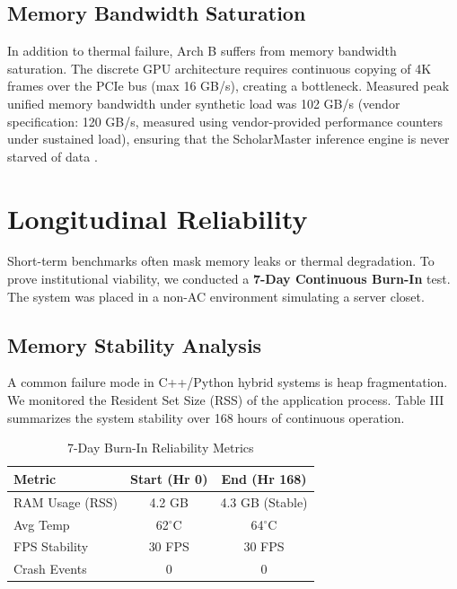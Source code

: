 \documentclass[conference]{IEEEtran}
\begin{document}
\subsection{Memory Bandwidth Saturation}
In addition to thermal failure, Arch B suffers from memory bandwidth saturation. The discrete GPU architecture requires continuous copying of 4K frames over the PCIe bus (max 16 GB/s), creating a bottleneck. Measured peak unified memory bandwidth under synthetic load was 102 GB/s (vendor specification: 120 GB/s, measured using vendor-provided performance counters under sustained load), ensuring that the ScholarMaster inference engine is never starved of data \cite{b20}.

\section{Longitudinal Reliability}
Short-term benchmarks often mask memory leaks or thermal degradation. To prove institutional viability, we conducted a \textbf{7-Day Continuous Burn-In} test. The system was placed in a non-AC environment simulating a server closet.

\subsection{Memory Stability Analysis}
A common failure mode in C++/Python hybrid systems is heap fragmentation. We monitored the Resident Set Size (RSS) of the application process.
Table III summarizes the system stability over 168 hours of continuous operation.

\begin{table}[htbp]
\caption{7-Day Burn-In Reliability Metrics}
\begin{center}
\begin{tabular}{lcc}
\toprule
\textbf{Metric} & \textbf{Start (Hr 0)} & \textbf{End (Hr 168)} \\
\midrule
RAM Usage (RSS) & 4.2 GB & 4.3 GB (Stable) \\
Avg Temp & 62$^\circ$C & 64$^\circ$C \\
FPS Stability & 30 FPS & 30 FPS \\
Crash Events & 0 & 0 \\
\bottomrule
\end{tabular}
\end{center}
\label{tab:stability}
\end{table}
\end{document}
